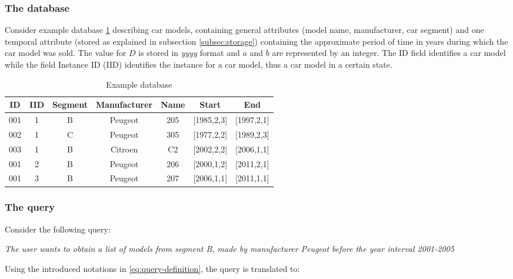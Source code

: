 \subsubsection{The database}
Consider example database \ref{tb:car-models} describing car models, containing general attributes (model name, manufacturer, car segment) and one temporal attribute (stored as explained in subsection \ref{subsec:storage}) containing the approximate period of time  in years during which the car model was sold. The value for $D$ is stored in \emph{yyyy} format and $a$ and $b$ are represented by an integer. The ID field identifies a car model while the field Instance ID (IID) identifies the instance for a car model, thus a car model in a certain state.
\begin{table}[h]
\centering
\caption{Example database}
\begin{tabular}{c c c c c c c}
\hline
ID & IID & Segment & Manufacturer & Name & Start & End  \\ [0.5ex]
\hline
001 & 1 & B & Peugeot & 205 & [1985,2,3] & [1997,2,1] \\
002 & 1 & C & Peugeot & 305 & [1977,2,2] & [1989,2,3] \\
003 & 1 & B & Citroen & C2 & [2002,2,2] & [2006,1,1] \\
001 & 2 & B & Peugeot & 206 & [2000,1,2] & [2011,2,1] \\
001 & 3 & B & Peugeot & 207 & [2006,1,1] & [2011,1,1]\\
\hline
\end{tabular}
\vspace{10pt}

\label{tb:car-models}

\vspace{-30pt}

\end{table}

\subsubsection{The query}
Consider the following query:
\begin{center}
\emph{The user wants to obtain a list of models from segment B, made by manufacturer Peugeot before the year interval 2001-2005}
\end{center}

Using the introduced notations in \eqref{eq:query-definition}, the query is translated to: %

